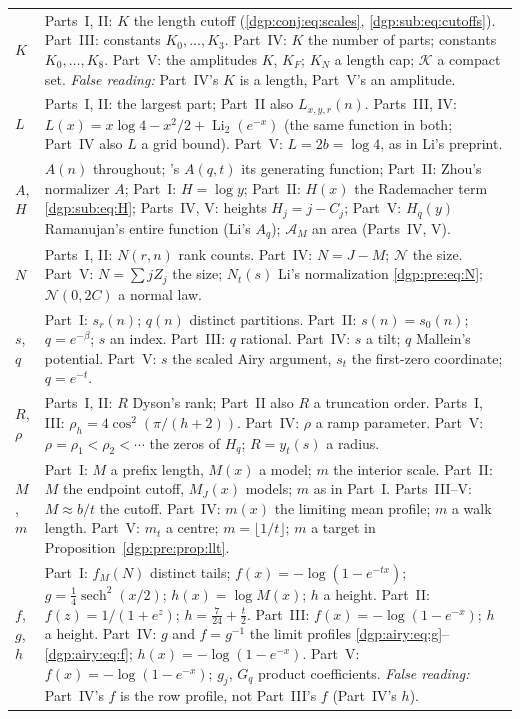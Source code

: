 \documentclass[11pt,letterpaper]{article}
\numberwithin{equation}{section}
\theoremstyle{remark}\newtheorem{remark}[theorem]{Remark}
\begin{document}
\begin{longtable}{@{}>{\raggedright\arraybackslash}p{} >{\raggedright\arraybackslash}p{}@{}}
$K$ & Parts~I, II: $K$ the length cutoff (\eqref{dgp:conj:eq:scales}, \eqref{dgp:sub:eq:cutoffs}). Part~III: constants $K_0,\dots,K_3$. Part~IV: $K$ the number of parts; constants $K_0,\dots,K_8$. Part~V: the amplitudes $K$, $K_F$; $K_N$ a length cap; $\mathcal K$ a compact set. \emph{False reading:} Part~IV's $K$ is a length, Part~V's an amplitude.\\
$L$ & Parts~I, II: the largest part; Part~II also $L_{x,y,r}(n)$. Parts~III, IV: $L(x)=x\log4-x^2/2+\operatorname{Li}_2(e^{-x})$ (the same function in both; Part~IV also $L$ a grid bound). Part~V: $L=2b=\log4$, as in Li's preprint.\\
$A$, $H$ & $A(n)$ throughout; \cite{abek}'s $A(q,t)$ its generating function; Part~II: Zhou's normalizer $A$; Part~I: $H=\log y$; Part~II: $H(x)$ the Rademacher term \eqref{dgp:sub:eq:H}; Parts~IV, V: heights $H_j=j-C_j$; Part~V: $H_q(y)$ Ramanujan's entire function (Li's $A_q$); $\mathcal A_M$ an area (Parts~IV, V).\\
$N$ & Parts~I, II: $N(r,n)$ rank counts. Part~IV: $N=J-M$; $\mathcal N$ the size. Part~V: $N=\sum jZ_j$ the size; $N_t(s)$ Li's normalization \eqref{dgp:pre:eq:N}; $\mathcal N(0,2C)$ a normal law.\\
$s$, $q$ & Part~I: $s_r(n)$; $q(n)$ distinct partitions. Part~II: $s(n)=s_0(n)$; $q=e^{-\beta}$; $s$ an index. Part~III: $q$ rational. Part~IV: $s$ a tilt; $q$ Mallein's potential. Part~V: $s$ the scaled Airy argument, $s_t$ the first-zero coordinate; $q=e^{-t}$.\\
$R$, $\rho$ & Parts~I, II: $R$ Dyson's rank; Part~II also $R$ a truncation order. Parts~I, III: $\rho_h=4\cos^2(\pi/(h+2))$. Part~IV: $\rho$ a ramp parameter. Part~V: $\rho=\rho_1<\rho_2<\cdots$ the zeros of $H_q$; $R=y_t(s)$ a radius.\\
$M$, $m$ & Part~I: $M$ a prefix length, $M(x)$ a model; $m$ the interior scale. Part~II: $M$ the endpoint cutoff, $M_J(x)$ models; $m$ as in Part~I. Parts~III--V: $M\approx b/t$ the cutoff. Part~IV: $m(x)$ the limiting mean profile; $m$ a walk length. Part~V: $m_t$ a centre; $m=\lfloor1/t\rfloor$; $m$ a target in Proposition~\ref{dgp:pre:prop:llt}.\\
$f$, $g$, $h$ & Part~I: $f_M(N)$ distinct tails; $f(x)=-\log(1-e^{-tx})$; $g=\frac14\operatorname{sech}^2(x/2)$; $h(x)=\log M(x)$; $h$ a height. Part~II: $f(z)=1/(1+e^z)$; $h=\frac7{24}+\frac t2$. Part~III: $f(x)=-\log(1-e^{-x})$; $h$ a height. Part~IV: $g$ and $f=g^{-1}$ the limit profiles \eqref{dgp:airy:eq:g}--\eqref{dgp:airy:eq:f}; $h(x)=-\log(1-e^{-x})$. Part~V: $f(x)=-\log(1-e^{-x})$; $g_j$, $G_q$ product coefficients. \emph{False reading:} Part~IV's $f$ is the row profile, not Part~III's $f$ (Part~IV's $h$).\\

\end{longtable}
\end{document}
